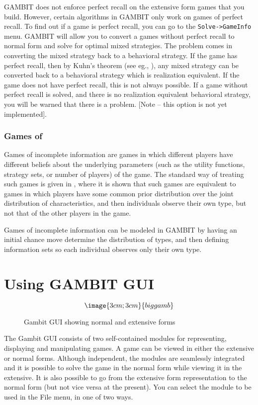 GAMBIT does not enforce perfect recall on the extensive form games that
you build.  However, certain algorithms in GAMBIT only work on games of 
perfect recall.  
To find out if a game is perfect recall, you can go to the {\tt Solve->GameInfo} 
menu.  GAMBIT will allow you to convert a games without perfect recall 
to normal form and solve for optimal 
mixed strategies.  The problem comes in converting the mixed strategy back
to a behavioral strategy.  If the game has perfect recall, then by Kuhn's 
theorem (see eg., \cite{vanDamme:1983}), any mixed strategy can be 
converted back to a behavioral strategy which is realization equivalent.   
If the game does not have perfect recall, this is not always possible.  
If a game without perfect recall is solved, and there is no realization
equivalent behavioral strategy, you will be warned that there is a
problem. [Note -- this option is not yet implemented].  
 

\subsection{Games of }\label{incinfsec}
Games of incomplete information are games in which different players have 
different beliefs about the underlying parameters (such as the utility 
functions, strategy sets, or number of players) of the game.  The standard 
way of treating such games is given in \cite{Harsanyi:1967}, where it
is shown that 
 such games are equivalent to games in which players have some common
prior distribution over the joint distribution of characteristics, and
 then individuals observe their own type, but not that of the other players 
in the game.  

Games of incomplete information can be modeled in GAMBIT by having an
initial chance move determine the distribution of types, and then
defining information sets so each individual observes only their own
type.

\chapter{Using GAMBIT GUI}

\begin{figure}
$$\image{3cm;3cm}{biggamb}$$
\caption{Gambit GUI showing normal and extensive
forms}\label{fig_biggamb}
\end{figure}

The Gambit GUI consists of two self-contained modules for representing,
displaying and manipulating games.  A game can be viewed in either the
extensive or normal forms.  Although independent, the modules are
seamlessly integrated and it is possible to solve the game in the normal
form while viewing it in the extensive.  It is also possible to go from
the extensive form representation to the normal form (but not vice versa
at the present).   You can select the module to be used in the File menu,
in one of two ways.


